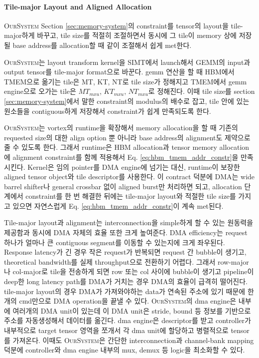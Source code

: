 \documentclass[11pt]{article}
\newcommand{\ours}{\textsc{OurSystem}}
\begin{document}
\paragraph{Tile-major Layout and Aligned Allocation}

\ours{} Section \ref{sec:memory-system}의 constraint를 tensor의 layout을 tile-major하게 바꾸고, tile size를 적절히 조절하면서 동시에 그 tile이 memory 상에 저장될 base address를 allocation할 때 같이 조절해서 쉽게 met한다.

\ours{}는 layout transform kernel을 SIMT에서 launch해서 GEMM의 input과 output tensor를 tile-major format으로 바꾼다. gemm 연산을 할 때 HBM에서 TMEM으로 옮기는 tile은 MT, KT, NT로 tile size가 정해지고 TMEM에서 gemm engine으로 오가는 tile은 $MT_{mxu}$, $KT_{mxu}$, $NT_{mxu}$로 정해진다. 이때 tile size를 section \ref{sec:memory-system}에서 말한 constraint의 modulus의 배수로 잡고, tile 안에 있는 원소들을 contiguous하게 저장해서 constraint가 쉽게 만족되도록 한다.

\ours{}는 vortex의 runtime을 확장해서 memory allocation을 할 때 기존의 requested size의 대한 align option 뿐 아니라 base address의 alignment도 제약으로 줄 수 있도록 한다.
그래서 runtime은 HBM allocation과 tensor memory allocation에 alignment constraint를 함께 적용해서 Eq. \ref{eq:hbm_tmem_addr_constr}을 만족시킨다.
Kernel은 임의 pointer를 DMA engine에 넘기는 대신, runtime이 보장한 aligned tensor object와 tile descriptor를 사용한다.
이 contract 덕분에 DMA는 wide barrel shifter나 general crossbar 없이 aligned burst만 처리하면 되고, allocation 단계에서 constraint를 한 번 해결한 뒤에는 tile-major layout와 적절한 tile size를 가지고 있으면 자연스럽게 Eq. \ref{eq:hbm_tmem_addr_constr}이 계속 met된다.

Tile-major layout과 alignment는 interconnection을 simple하게 할 수 있는 원동력을 제공함과 동시에 DMA 자체의 효율 또한 크게 높여준다. DMA efficiency는 request 하나가 얼마나 큰 contiguous segment를 이동할 수 있는지에 크게 좌우된다.
Response latency가 긴 경우 작은 request가 반복되면 request 간 bubble이 생기고, theoretical bandwidth를 실제 throughput으로 전환하기 어렵다.
그래서 row-major나 col-major로 tile을 전송하게 되면 row 또는 col 사이에 bubble이 생기고 pipeline이 deep한 long latency path를 DMA가 거치는 경우 DMA의 효율이 급격히 떨어진다.
tile-major layout의 경우 DMA가 가져와야하는 data가 연속된 주소에 있기 때문에 한개의 cmd만으로 DMA operation을 끝낼 수 있다.
\ours{}의 dma engine은 내부에 여러개의 DMA unit이 있는데 이 DMA unit은 stride, bound 등 정보를 기반으로 주소를 자동생성해서 데이터를 옮긴다. dma engine은 descriptor를 받고 controller가 내부적으로 target tensor 영역을 쪼개서 각 dma unit에 할당하고 병렬적으로 tensor를 가져온다. 이때도 \ours{}은 간단한 interconnection과 channel-bank mapping 덕분에 controller와 dma engine 내부의 mux, demux 등 logic을 최소화할 수 있다.
\end{document}
